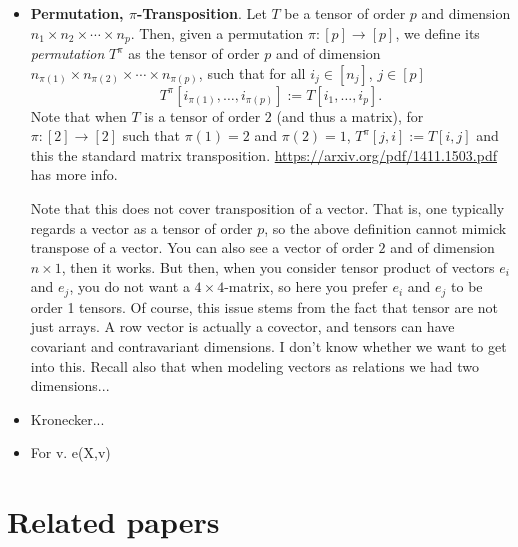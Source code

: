 \begin{itemize}
\item \textbf{Permutation, $\pi$-Transposition}. Let $T$ be a tensor of order $p$ and dimension $n_1\times n_2\times\cdots\times n_p$. Then, given a permutation 
$\pi:[p]\to [p]$, we define its \textit{permutation} $T^\pi$ as the tensor of order $p$ and of dimension
$n_{\pi(1)}\times n_{\pi(2)}\times\cdots\times n_{\pi(p)}$, such that for all $i_j\in[n_j]$, $j\in[p]$
$$
T^{\pi}[i_{\pi(1)},\ldots,i_{\pi(p)}]:=T[i_1,\ldots,i_p].
$$
Note that when $T$ is a tensor of order $2$ (and thus a matrix), for $\pi:[2]\to[2]$ such that $\pi(1)=2$ and $\pi(2)=1$,
$T^\pi[j,i]:=T[i,j]$ and this the standard matrix transposition. \url{https://arxiv.org/pdf/1411.1503.pdf} has more info.

Note that this does not cover transposition of a vector. That is, one typically regards a vector as a tensor of order $p$, so the above definition cannot mimick transpose of a vector. You can also see a vector of order $2$ and of dimension $n\times 1$, then it works. But then, when you consider tensor product of vectors $e_i$ and $e_j$, you do not want a $4\times 4$-matrix, so here you prefer $e_i$ and $e_j$ to be order 1 tensors.
Of course, this issue stems from the fact that tensor are not just arrays. A row vector is actually a covector, and tensors can have covariant and contravariant dimensions. I don't know whether we want to get into this. Recall also that when modeling vectors as relations we had two dimensions...


\item Kronecker...

\item For v. e(X,v)
 \end{itemize}


\section{Related papers}

